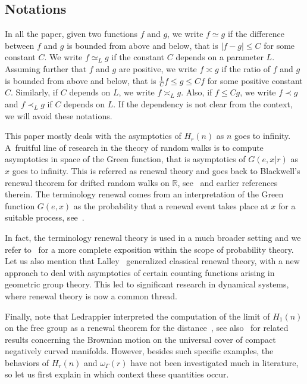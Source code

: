 \documentclass[AHL,Unicode,longabstracts]{cedram}
\newcommand{\R}{\mathbb{R}}
\begin{document}
\subsection*{Notations}
In all the paper, given two functions $f$ and $g$, we write $f\simeq g$ if the difference between $f$ and $g$ is bounded from above and below, that is $|f-g|\leq C$ for some constant $C$. We write $f\simeq_L g$ if the constant $C$ depends on a parameter $L$. Assuming further that $f$ and $g$ are positive, we write $f\asymp g$ if the ratio of $f$ and $g$ is bounded\pagebreak{} from above and below, that is $\frac{1}{C}f\leq g\leq Cf$ for some positive constant $C$. Similarly, if $C$ depends on $L$, we write $f\asymp_L g$. Also, if $f\leq Cg$, we write $f\prec g$ and $f\prec_L g$ if $C$ depends on $L$. If the dependency is not clear from the context, we will avoid these notations.


This paper mostly deals with the asymptotics of $H_r(n)$ as $n$ goes to infinity. A~fruitful line of research in the theory of random walks is to compute asymptotics in space of the Green function, that is asymptotics of $G(e,x|r)$ as $x$ goes to infinity. This is referred as renewal theory and goes back to Blackwell's renewal theorem for drifted random walks on $\R$, see~\cite{Blackwell} and earlier references therein. The terminology renewal comes from an interpretation of the Green function $G(e,x)$ as the probability that a renewal event takes place at $x$ for a suitable process, see~\cite[Chapter~II.9]{Spitzer}.

In fact, the terminology renewal theory is used in a much broader setting and we refer to~\cite[Chapter~XI]{Feller} for a more complete exposition within the scope of probability theory. Let us also mention that Lalley~\cite{Lalleyrenewal} generalized classical renewal theory, with a new approach to deal with asymptotics of certain counting functions arising in geometric group theory. This led to significant research in dynamical systems, where renewal theory is now a common thread.

Finally, note that Ledrappier interpreted the computation of the limit of $H_1(n)$ on the free group as a renewal theorem for the distance~\cite{Ledrappier01}, see also~\cite{Ledrappier93} for related results concerning the Brownian motion on the universal cover of compact negatively curved manifolds. However, besides such specific examples, the behaviors of $H_r(n)$ and $\omega_\Gamma(r)$ have not been investigated much in literature, so let us first explain in which context these quantities occur.
\end{document}
